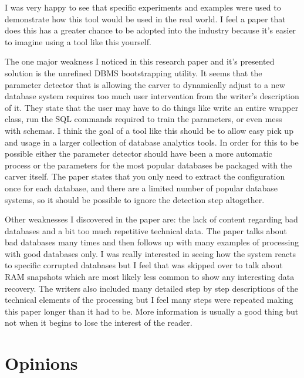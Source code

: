 \documentclass[11pt,]{article}
\begin{document}
I was very happy to see that specific experiments and examples were used
to demonstrate how this tool would be used in the real world. I feel a
paper that does this has a greater chance to be adopted into the
industry because it's easier to imagine using a tool like this yourself.

The one major weakness I noticed in this research paper and it's
presented solution is the unrefined DBMS bootstrapping utility. It seems
that the parameter detector that is allowing the carver to dynamically
adjust to a new database system requires too much user intervention from
the writer's description of it. They state that the user may have to do
things like write an entire wrapper class, run the SQL commands required
to train the parameters, or even mess with schemas. I think the goal of
a tool like this should be to allow easy pick up and usage in a larger
collection of database analytics tools. In order for this to be possible
either the parameter detector should have been a more automatic process
or the parameters for the most popular databases be packaged with the
carver itself. The paper states that you only need to extract the
configuration once for each database, and there are a limited number of
popular database systems, so it should be possible to ignore the
detection step altogether.

Other weaknesses I discovered in the paper are: the lack of content
regarding bad databases and a bit too much repetitive technical data.
The paper talks about bad databases many times and then follows up with
many examples of processing with good databases only. I was really
interested in seeing how the system reacts to specific corrupted
databases but I feel that was skipped over to talk about RAM snapshots
which are most likely less common to show any interesting data recovery.
The writers also included many detailed step by step descriptions of the
technical elements of the processing but I feel many steps were repeated
making this paper longer than it had to be. More information is usually
a good thing but not when it begins to lose the interest of the reader.

\hypertarget{opinions}{%
\section{Opinions}\label{opinions}}
\end{document}
